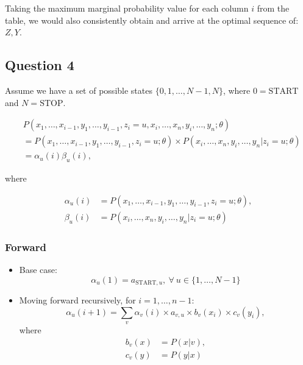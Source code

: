 \documentclass[11pt,fancychapters]{article}
\begin{document}
Taking the maximum marginal probability value for each column $i$ from the table, we would also consistently obtain and arrive at the optimal sequence of: $Z, Y$.

\subsection*{Question 4}

Assume we have a set of possible states $\{ 0, 1, \ldots, N - 1, N \}$, where $0 = \text{START}$ and $N = \text{STOP}$.

\begin{align*}
	&P(x_1, \ldots, x_{i-1}, y_1, \ldots, y_{i-1}, z_i = u, x_i, \ldots, x_n, y_i, \ldots, y_n; \theta) \\
	&= P(x_1, \ldots, x_{i-1}, y_1, \ldots, y_{i-1}, z_i = u; \theta) \times P(x_i, \ldots, x_n, y_i, \ldots, y_n | z_i = u; \theta) \\
	&= \alpha_u(i) \beta_u(i),
\end{align*}

where

\begin{align*}
	\alpha_u(i) &= P(x_1, \ldots, x_{i-1}, y_1, \ldots, y_{i-1}, z_i = u; \theta), \\
	\beta_u(i) &= P(x_i, \ldots, x_n, y_i, \ldots, y_n | z_i = u; \theta)
\end{align*}

\subsubsection*{Forward}

\begin{itemize}
	\item Base case:
	\begin{equation*}
		\alpha_u(1) = a_{\text{START}, u}, ~ \forall ~ u \in \{ 1, \ldots, N - 1 \}
	\end{equation*}

	\item Moving forward recursively, for $i = 1, \ldots, n - 1$:
	\begin{equation*}
		\alpha_u(i + 1) = \sum_v \alpha_v(i) \times a_{v, u} \times b_v(x_i) \times c_v(y_i),
	\end{equation*}
	where
	\begin{align*}
		b_v(x) &= P(x | v), \\
		c_v(y) &= P(y | x)
	\end{align*}
\end{itemize}
\end{document}
